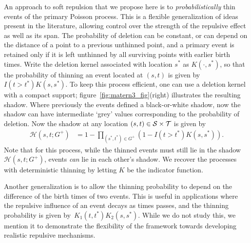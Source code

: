 \documentclass{statsoc}
\begin{document}
An approach to soft repulsion that we propose here is to \emph{probabilistically} thin events of the primary Poisson process. %
This is a flexible generalization of ideas present in the literature, allowing control over the strength of the repulsive effect as well as 
its span. The probability of deletion can be constant, or can depend on the distance of a point to a previous unthinned point, and a
primary event is retained only if it is left unthinned by all surviving points with earlier birth times. Write the deletion kernel associated
with location $s^*$ as $K(\cdot, s^*)$, so that the probability of thinning an event located at $(s,t)$ is given by $I(t > t^*)K(s, s^*)$. To keep this process efficient, 
one can use a deletion kernel with a compact support; figure~\ref{fig:matern3_fig}(right) illustrates the resulting shadow.
Where previously the \matern events defined a black-or-white shadow, now the shadow can have intermediate `grey' values corresponding
to the probability of deletion. Now the shadow at any location $(s,t) \in {\mathcal S} \times {\mathcal T}$ is given by
\begin{align}
  \mathscr{H}(s,t;G^+) &= 1 - \!\!\!\!\!\!\! \prod_{(s^*,t^*) \in G^+} \!\!\!\!\!\! \left(1 - I(t > t^*) K(s, s^*) \right). \label{eq:thin_shad}
\end{align}
Note that for this process, while the thinned events must still lie in the shadow $\mathscr{H}(s,t;G^+)$, \matern events \emph{can} lie in each other's shadow.
We recover the \matern processes with deterministic thinning by letting $K$ be the indicator function.

Another generalization is to allow the thinning probability to depend on the difference of the birth times of two events. This is useful in
applications where the repulsive influence of an event decays as times passes, and the thinning probability is given by~$K_1(t, t^*)K_2(s, s^*)$.
While we do not study this, we mention it to demonstrate the flexibility of the \matern framework towards developing realistic 
repulsive mechanisms.
\end{document}
